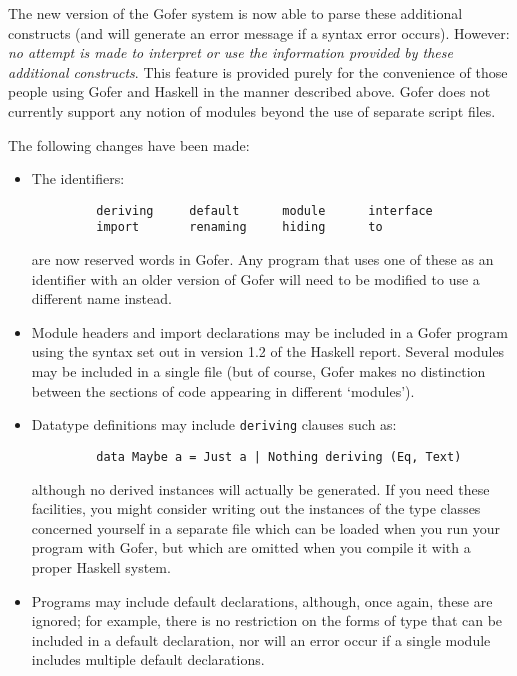 The new version of the Gofer system is now able to parse these
additional constructs (and will generate an error message if a syntax
error occurs).  However: {\em no attempt is made to interpret or use the
information provided by these additional constructs}.  This feature is
provided purely for the convenience of those people using Gofer and
Haskell in the manner described above.  Gofer does not currently
support any notion of modules beyond the use of separate script files.

The following changes have been made:
\begin{itemize}
\item  The identifiers:
\begin{verbatim}
         deriving     default      module      interface
         import       renaming     hiding      to
\end{verbatim}
     are now reserved words in Gofer.  Any program that uses one of
     these as an identifier with an older version of Gofer will need
     to be modified to use a different name instead.

\item  Module headers and import declarations may be included in a Gofer
     program using the syntax set out in version 1.2 of the Haskell
     report.  Several modules may be included in a single file (but of
     course, Gofer makes no distinction between the sections of code
     appearing in different `modules').

\item  Datatype definitions may include \verb"deriving" clauses such as:
\begin{verbatim}
         data Maybe a = Just a | Nothing deriving (Eq, Text)
\end{verbatim}
     although no derived instances will actually be generated.
     If you need these facilities, you might consider writing out
     the instances of the type classes concerned yourself in a
     separate file which can be loaded when you run your program
     with Gofer, but which are omitted when you compile it with a
     proper Haskell system.

\item  Programs may include default declarations, although, once again,
     these are ignored; for example, there is no restriction on the
     forms of type that can be included in a default declaration, nor
     will an error occur if a single module includes multiple default
     declarations.
\end{itemize}

